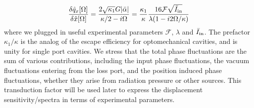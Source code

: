 \begin{equation}
  \frac{\delta \hat{q}_x[\Omega]}{\delta \hat{x}[\Omega]} =  \frac{2\sqrt{\kappa_1}G|\bar \alpha|}{\kappa/2 - i\Omega} = \frac{\kappa_1}{\kappa} \dfrac{16 \mathcal{F}\sqrt{\bar{I}_{\rm in}}}{\lambda (1- i2\Omega/\kappa)}
\end{equation}
where we plugged in useful experimental parameters $\mathcal{F}$, $\lambda$ and $\bar I_{\rm in}$. The prefactor $\kappa_1/\kappa$ is the analog of the escape efficiency for optomechanical cavities, and is unity for single port cavities. We stress that the total phase fluctuations are the sum of various contributions, including the input phase fluctuations, the vacuum fluctuations entering from the loss port, and the position induced phase fluctuations, whether they arise from radiation pressure or other sources. This transduction factor will be used later to express the displacement sensitivity/spectra in terms of experimental parameters. \\


